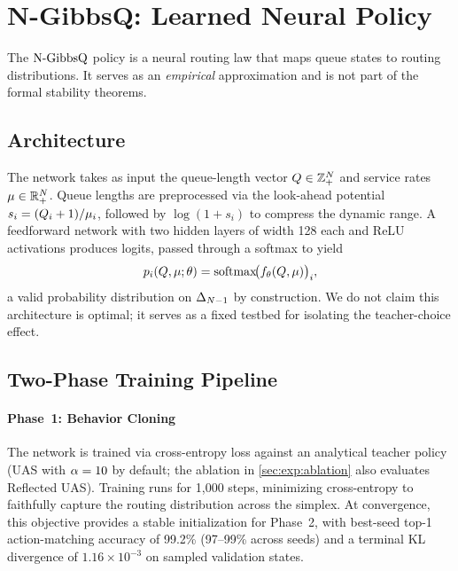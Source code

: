 
\section{N-GibbsQ: Learned Neural Policy}
\label{sec:neural_policy}

The $\text{N-GibbsQ}$ policy is a neural routing law that maps queue states to routing distributions.
It serves as an \emph{empirical} approximation and is not part of the formal stability theorems.

\subsection{Architecture}

The network takes as input the queue-length vector $Q \in \mathbb{Z}_+^N$ and service rates $\mu \in \mathbb{R}_+^N$.
Queue lengths are preprocessed via the look-ahead potential $s_i = (Q_{i}+1)/\mu_i$, followed by $\log(1 + s_i)$ to compress the dynamic range.
A feedforward network with two hidden layers of width 128 each and ReLU activations produces logits, passed through a softmax to yield
\begin{equation}
\label{eq:neural_output}
p_{i}(Q, \mu; \theta) = \mathrm{softmax}\!\bigl(f_\theta(Q, \mu)\bigr)_i,
\end{equation}
a valid probability distribution on $\Delta_{N-1}$ by construction.
We do not claim this architecture is optimal; it serves as a fixed testbed for isolating the teacher-choice effect.

\subsection{Two-Phase Training Pipeline}

\paragraph{Phase~1: Behavior Cloning}
The network is trained via cross-entropy loss against an analytical teacher policy (UAS with $\alpha = 10$ by default; the ablation in \cref{sec:exp:ablation} also evaluates Reflected UAS).
Training runs for 1{,}000 steps, minimizing cross-entropy to faithfully capture the routing distribution across the simplex. At convergence, this objective provides a stable initialization for Phase~2, with best-seed top-1 action-matching accuracy of 99.2\% (97--99\% across seeds) and a terminal KL divergence of $1.16 \times 10^{-3}$ on sampled validation states.

